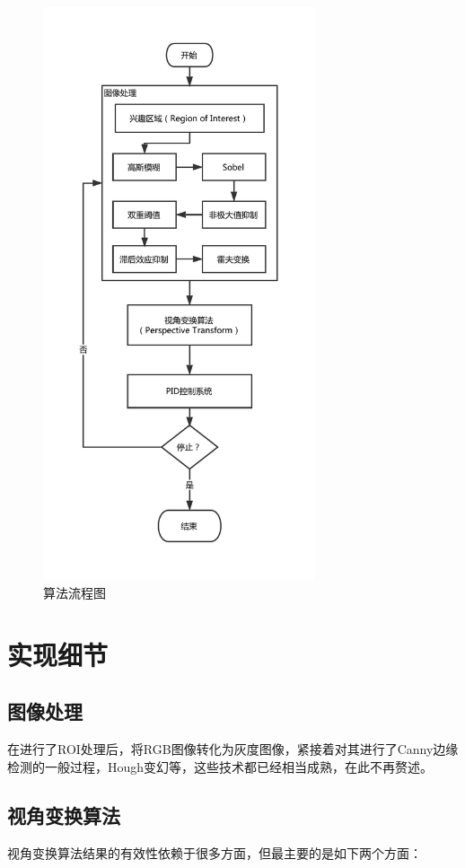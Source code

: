 \documentclass[11pt]{article}
\begin{document}
\begin{figure}[h!]
	\centering
	\includegraphics[width=8cm]{Graphs/flow-chart}
	\caption{算法流程图}
	\label{fig:flow-chart}
\end{figure}

\section{实现细节}

\subsection{图像处理}
在进行了ROI处理后，将RGB图像转化为灰度图像，紧接着对其进行了Canny边缘检测的一般过程，Hough变幻等，这些技术都已经相当成熟，在此不再赘述。

\subsection{视角变换算法}
视角变换算法结果的有效性依赖于很多方面，但最主要的是如下两个方面：
\end{document}
